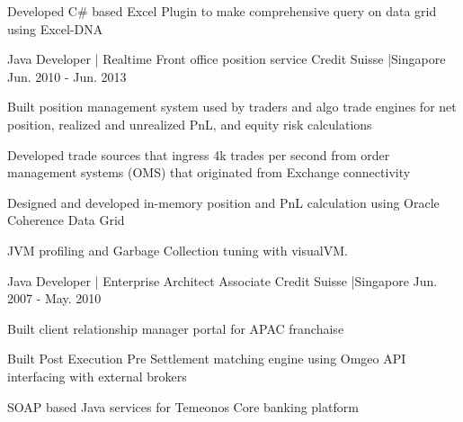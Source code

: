 \begin{cventries}
{\begin{cvitems}
        \item {Developed C# based Excel Plugin to make comprehensive query on data grid using Excel-DNA}
      \end{cvitems}
    }
    {Java Developer | Realtime Front office position service}
    {Credit Suisse |Singapore}
    {Jun. 2010 - Jun. 2013}
    {
      \begin{cvitems}
        \item {Built position management system used by traders and algo trade engines for net position, realized and unrealized PnL, and equity risk calculations}
        \item {Developed trade sources that ingress 4k trades per second from order management systems (OMS) that originated from Exchange connectivity}
        \item {Designed and developed in-memory position and PnL calculation using Oracle Coherence Data Grid }
        \item {JVM profiling and Garbage Collection tuning with visualVM.}
      \end{cvitems}
    }
    {Java Developer | Enterprise Architect Associate }
    {Credit Suisse |Singapore}
    {Jun. 2007 - May. 2010}
    {
      \begin{cvitems}
        \item {Built client relationship manager portal for APAC franchaise }
        \item {Built Post Execution Pre Settlement matching engine using Omgeo API interfacing with external brokers }
        \item {SOAP based Java services for Temeonos Core banking platform }
       \end{cvitems}
    }

\end{cventries}
